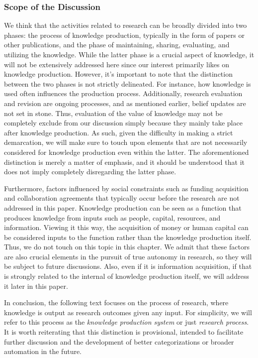 \subsubsection{Scope of the Discussion}
We think that the activities related to research can be broadly divided into two phases: the process of knowledge production, typically in the form of papers or other publications, and the phase of maintaining, sharing, evaluating, and utilizing the knowledge. While the latter phase is a crucial aspect of knowledge, it will not be extensively addressed here since our interest primarily likes on knowledge production. However, it's important to note that the distinction between the two phases is not strictly delineated. For instance, how knowledge is used often influences the production process. Additionally, research evaluation and revision are ongoing processes, and as mentioned earlier, belief updates are not set in stone. Thus, evaluation of the value of knowledge may not be completely exclude from our discussion simply because they mainly take place after knowledge production. As such, given the difficulty in making a strict demarcation, we will make sure to touch upon elements that are not necessarily considered for knowledge production even within the latter. The aforementioned distinction is merely a matter of emphasis, and it should be understood that it does not imply completely disregarding the latter phase.

Furthermore, factors influenced by social constraints such as funding acquisition and collaboration agreements that typically occur before the research are not addressed in this paper. Knowledge production can be seen as a function that produces knowledge from inputs such as people, capital, resources, and information. Viewing it this way, the acquisition of money or human capital can be considered inputs to the function rather than the knowledge production itself. Thus, we do not touch on this topic in this chapter. We admit that these factors are also crucial elements in the pursuit of true autonomy in research, so they will be subject to future discussions. Also, even if it is information acquisition, if that is strongly related to the internal of knowledge production itself, we will address it later in this paper. 

In conclusion, the following text focuses on the process of research, where knowledge is output as research outcomes given any input. For simplicity, we will refer to this process as the \textit{knowledge production system} or just \textit{research process}. It is worth reiterating that this distinction is provisional, intended to facilitate further discussion and the development of better categorizations or broader automation in the future.

